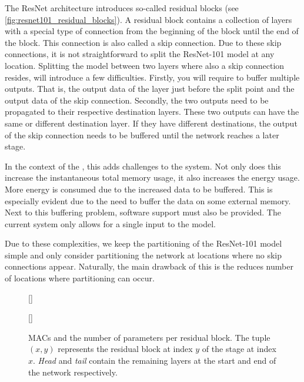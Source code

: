 The ResNet architecture introduces so-called residual blocks (see \cref{fig:resnet101_residual_blocks}).
A residual block contains a collection of layers with a special type of connection from the beginning of the block until the end of the block.
This connection is also called a skip connection.
Due to these skip connections, it is not straightforward to split the ResNet-101 model at any location.
Splitting the model between two layers where also a skip connection resides, will introduce a few difficulties.
Firstly, you will require to buffer multiple outputs.
That is, the output data of the layer just before the split point and the output data of the skip connection.
Secondly, the two outputs need to be propagated to their respective destination layers.
These two outputs can have the same or different destination layer.
If they have different destinations, the output of the skip connection needs to be buffered until the network reaches a later stage.

In the context of the \graicore{}, this adds challenges to the system.
Not only does this increase the instantaneous total memory usage, it also increases the energy usage.
More energy is consumed due to the increased data to be buffered.
This is especially evident due to the need to buffer the data on some external memory.
Next to this buffering problem, software support must also be provided.
The current system only allows for a single input to the model. 

Due to these complexities, we keep the partitioning of the ResNet-101 model simple and only consider partitioning the network at locations where no skip connections appear.
Naturally, the main drawback of this is the reduces number of locations where partitioning can occur.

\begin{figure}[hbtp]
    \centering
    [\textwidth]{
        
    }
    [\textwidth]{
        
    }
    \caption{
        MACs and the number of parameters per residual block.
        The tuple $(x, y)$ represents the residual block at index $y$ of the stage at index $x$.
        \textit{Head} and \textit{tail} contain the remaining layers at the start and end of the network respectively.
    }
    \label{fig:resnet101_stats}
\end{figure}


